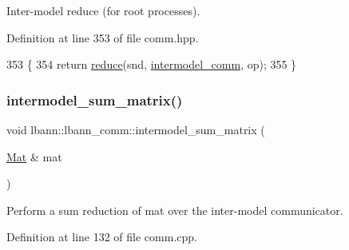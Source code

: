Inter-\/model reduce (for root processes). 

Definition at line 353 of file comm.\+hpp.


\begin{DoxyCode}
353                                                     \{
354     \textcolor{keywordflow}{return} \hyperlink{classlbann_1_1lbann__comm_ab8a2261394c978aa7e4b74ecebc739a8}{reduce}(snd, \hyperlink{classlbann_1_1lbann__comm_a2c51c5d8faf4f0ab4f43b892c55e597b}{intermodel\_comm}, op);
355   \}
\end{DoxyCode}
\mbox{\label{classlbann_1_1lbann__comm_a68b36ba64db34f33cb135bc64c4623e0}} 
\subsubsection{\texorpdfstring{intermodel\+\_\+sum\+\_\+matrix()}{intermodel\_sum\_matrix()}\hspace{0.1cm}{\footnotesize\ttfamily [1/2]}}
{\footnotesize\ttfamily void lbann\+::lbann\+\_\+comm\+::intermodel\+\_\+sum\+\_\+matrix (\begin{DoxyParamCaption}\item[{\hyperlink{base_8hpp_a68f11fdc31b62516cb310831bbe54d73}{Mat} \&}]{mat }\end{DoxyParamCaption})}

Perform a sum reduction of mat over the inter-\/model communicator. 

Definition at line 132 of file comm.\+cpp.


